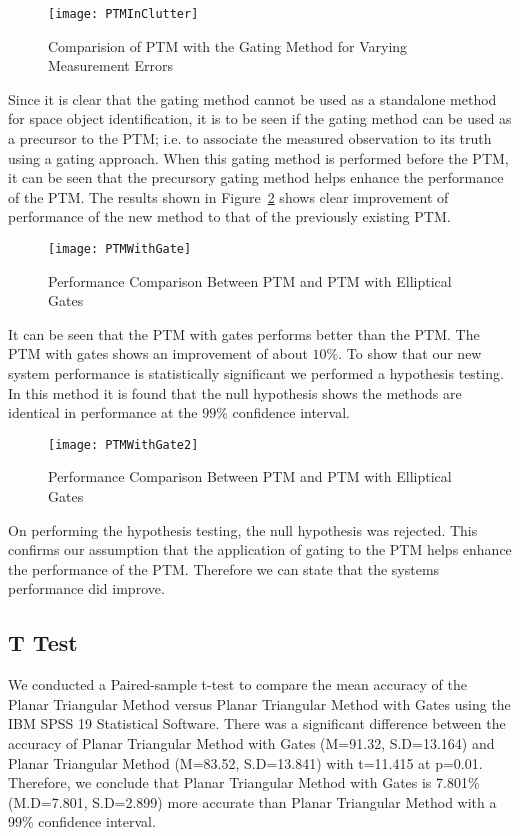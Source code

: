 \documentclass[]{aiaa-tc}%
\begin{document}
\begin{figure}[h]
\centering
\texttt{[image: PTMInClutter]}
\caption{Comparision of PTM with the Gating Method for Varying Measurement Errors}
\label{PTMInClutter}
\end{figure}

Since it is clear that the gating method cannot be used as a standalone method for space object identification, it is to be seen if the gating method can be used as a precursor to the PTM; i.e. to associate the measured observation to its truth using a gating approach. When this gating method is performed before the PTM, it can be seen that the precursory gating method helps enhance the performance of the PTM. The results shown in Figure~\ref{PTMWithGate} shows clear improvement of performance of the new method to that of the previously existing PTM.\\

\begin{figure}[h]
\centering
\texttt{[image: PTMWithGate]}
\caption{Performance Comparison Between PTM and PTM with Elliptical Gates}
\label{PTMWithGate}
\end{figure}

It can be seen that the PTM with gates performs better than the PTM. The PTM with gates shows an improvement of about $10 \%$. To show that our new system performance is statistically significant we performed a hypothesis testing. In this method it is found that the null hypothesis shows the methods are identical in performance at the $99\%$ confidence interval.\\

\begin{figure}[h]
\centering
\texttt{[image: PTMWithGate2]}
\caption{Performance Comparison Between PTM and PTM with Elliptical Gates}
\label{PTMWithGate2}
\end{figure}

On performing the hypothesis testing, the null hypothesis was rejected. This confirms our assumption that the application of gating to the PTM helps enhance the performance of the PTM. Therefore we can state that the systems performance did improve. \\
 
\subsection{T Test}

We conducted a Paired-sample t-test to compare the mean accuracy of the Planar Triangular Method versus Planar Triangular Method with Gates using the IBM SPSS 19 Statistical Software. There was a significant difference between the accuracy of Planar Triangular Method with Gates (M=91.32, S.D=13.164) and Planar Triangular Method (M=83.52, S.D=13.841) with t=11.415 at p=0.01. Therefore, we conclude that Planar Triangular Method with Gates is 7.801\% (M.D=7.801, S.D=2.899) more accurate than Planar Triangular Method with a 99\% confidence interval.
\end{document}
